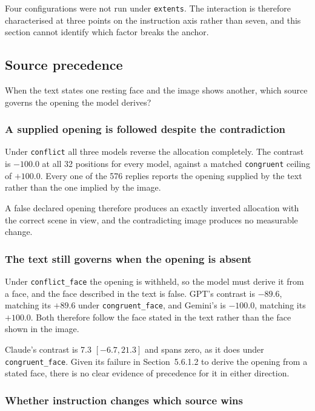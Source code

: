 Four configurations were not run under \texttt{extents}. The interaction is
therefore characterised at three points on the instruction axis rather than
seven, and this section cannot identify which factor breaks the anchor.


\subsection{Source precedence}

When the text states one resting face and the image shows another, which source
governs the opening the model derives?

\subsubsection{A supplied opening is followed despite the contradiction}

Under \texttt{conflict} all three models reverse the allocation completely. The
contrast is $-100.0$ at all 32 positions for every model, against a matched
\texttt{congruent} ceiling of $+100.0$. Every one of the 576 replies reports
the opening supplied by the text rather than the one implied by the image.

A false declared opening therefore produces an exactly inverted allocation with
the correct scene in view, and the contradicting image produces no measurable
change.

\subsubsection{The text still governs when the opening is absent}

Under \texttt{conflict\_face} the opening is withheld, so the model must derive
it from a face, and the face described in the text is false. GPT's contrast is
$-89.6$, matching its $+89.6$ under \texttt{congruent\_face}, and Gemini's is
$-100.0$, matching its $+100.0$. Both therefore follow the face stated in the
text rather than the face shown in the image.

Claude's contrast is 7.3 $[-6.7, 21.3]$ and spans zero, as it does under
\texttt{congruent\_face}. Given its failure in Section~5.6.1.2 to derive the
opening from a stated face, there is no clear evidence of precedence for it in
either direction.

\subsubsection{Whether instruction changes which source wins}

